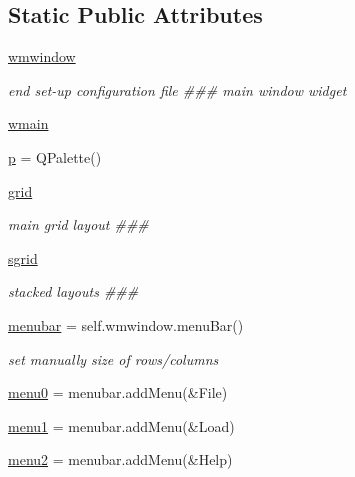 \subsection*{Static Public Attributes}
\begin{DoxyCompactItemize}
\item 
\hyperlink{classmolSimplify_1_1Classes_1_1mGUI_1_1mGUI_a69f59e24332ee44624458085d50c57e4}{wmwindow}
\begin{DoxyCompactList}\small\item\em end set-\/up configuration file \#\#\# main window widget \end{DoxyCompactList}\item 
\hyperlink{classmolSimplify_1_1Classes_1_1mGUI_1_1mGUI_a2a093b747b8f5db10156c4adca3c2617}{wmain}
\item 
\hyperlink{classmolSimplify_1_1Classes_1_1mGUI_1_1mGUI_a2e434f148e102c2477b03cc21d9bf714}{p} = Q\+Palette()
\item 
\hyperlink{classmolSimplify_1_1Classes_1_1mGUI_1_1mGUI_a97889f6eebbcc02efdffee78ae43d62c}{grid}
\begin{DoxyCompactList}\small\item\em main grid layout \#\#\# \end{DoxyCompactList}\item 
\hyperlink{classmolSimplify_1_1Classes_1_1mGUI_1_1mGUI_aaef504b69ae65530d7d0674e1e2606bb}{sgrid}
\begin{DoxyCompactList}\small\item\em stacked layouts \#\#\# \end{DoxyCompactList}\item 
\hyperlink{classmolSimplify_1_1Classes_1_1mGUI_1_1mGUI_a07d678d3a2fde27399deeef3f46beffd}{menubar} = self.\+wmwindow.\+menu\+Bar()
\begin{DoxyCompactList}\small\item\em set manually size of rows/columns \end{DoxyCompactList}\item 
\hyperlink{classmolSimplify_1_1Classes_1_1mGUI_1_1mGUI_a806e99299576ea3edbe0b80d268443ed}{menu0} = menubar.\+add\+Menu(\textquotesingle{}\&File\textquotesingle{})
\item 
\hyperlink{classmolSimplify_1_1Classes_1_1mGUI_1_1mGUI_a08c1fb2b6f1fc0226dfa8244b224c71e}{menu1} = menubar.\+add\+Menu(\textquotesingle{}\&Load\textquotesingle{})
\item 
\hyperlink{classmolSimplify_1_1Classes_1_1mGUI_1_1mGUI_a4bb346a4414813f43ac78de094e796ee}{menu2} = menubar.\+add\+Menu(\textquotesingle{}\&Help\textquotesingle{})

\end{DoxyCompactItemize}
